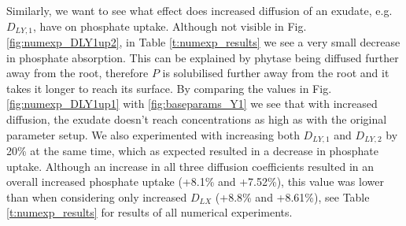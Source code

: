 \documentclass[11pt]{article}
\numberwithin{equation}{section}
\begin{document}
Similarly, we want to see what effect does increased diffusion of an exudate, e.g. $D_{LY,1}$, have on phosphate uptake. Although not visible in Fig. \ref{fig:numexp_DLY1up2}, in Table \ref{t:numexp_results} we see a very small decrease in phosphate absorption. This can be explained by phytase being diffused further away from the root, therefore $P$ is solubilised further away from the root and it takes it longer to reach its surface. By comparing the values in Fig. \ref{fig:numexp_DLY1up1} with \ref{fig:baseparams_Y1} we see that with increased diffusion, the exudate doesn't reach concentrations as high as with the original parameter setup. We also experimented with increasing both $D_{LY,1}$ and $D_{LY,2}$ by 20\% at the same time, which as expected resulted in a decrease in phosphate uptake. Although an increase in all three diffusion coefficients resulted in an overall increased phosphate uptake (+8.1\% and +7.52\%), this value was lower than when considering only increased $D_{LX}$ (+8.8\% and +8.61\%), see Table \ref{t:numexp_results} for results of all numerical experiments.
\end{document}
